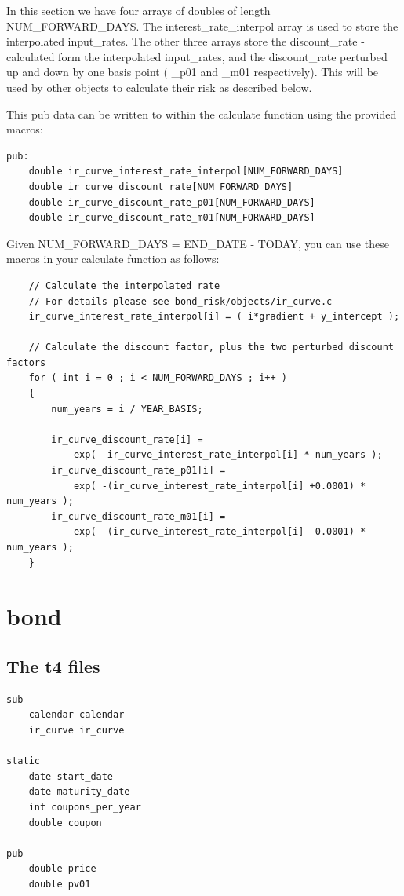 \documentclass{report}
\begin{document}
In this section we have four arrays of doubles of length NUM_FORWARD_DAYS. The interest_rate_interpol array is used to store the interpolated input_rates. The other three arrays store the discount_rate - calculated form the interpolated input_rates, and the discount_rate perturbed up and down by one basis point ( _p01 and _m01 respectively). This will be used by other objects to calculate their risk as described below. 

This pub data can be written to within the calculate function using the provided macros:
\begin{verbatim}
pub:
    double ir_curve_interest_rate_interpol[NUM_FORWARD_DAYS]
    double ir_curve_discount_rate[NUM_FORWARD_DAYS]
    double ir_curve_discount_rate_p01[NUM_FORWARD_DAYS]
    double ir_curve_discount_rate_m01[NUM_FORWARD_DAYS]
\end{verbatim}

Given NUM_FORWARD_DAYS = END_DATE - TODAY, you can use these macros in your calculate function as follows:

\begin{verbatim}
    // Calculate the interpolated rate
    // For details please see bond_risk/objects/ir_curve.c
    ir_curve_interest_rate_interpol[i] = ( i*gradient + y_intercept );

    // Calculate the discount factor, plus the two perturbed discount factors
    for ( int i = 0 ; i < NUM_FORWARD_DAYS ; i++ )
    {
        num_years = i / YEAR_BASIS;

        ir_curve_discount_rate[i] = 
            exp( -ir_curve_interest_rate_interpol[i] * num_years );
        ir_curve_discount_rate_p01[i] = 
            exp( -(ir_curve_interest_rate_interpol[i] +0.0001) * num_years );
        ir_curve_discount_rate_m01[i] = 
            exp( -(ir_curve_interest_rate_interpol[i] -0.0001) * num_years );
    }
\end{verbatim}

\section{bond}

\subsection{The t4 files}

\begin{verbatim}
sub
    calendar calendar
    ir_curve ir_curve

static
    date start_date
    date maturity_date
    int coupons_per_year
    double coupon

pub
    double price
    double pv01
\end{verbatim}
\end{document}
